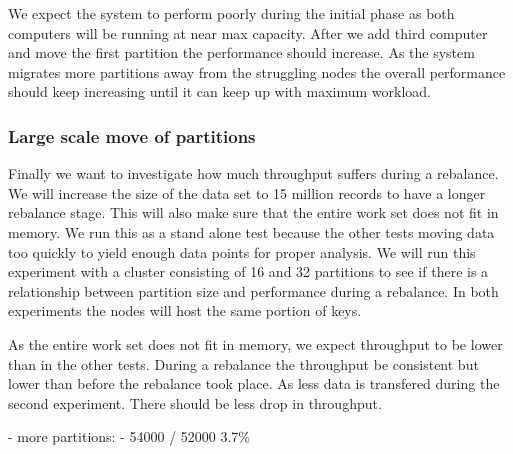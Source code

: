 We expect the system to perform poorly during the initial phase as both computers will be running at near max capacity. After we add third computer and move the first partition the performance should increase. As the system migrates more partitions away from the struggling nodes the overall performance should keep increasing until it can keep up with maximum workload. 

\subsubsection{Large scale move of partitions}
Finally we want to investigate how much throughput suffers during a rebalance. We will increase the size of the data set to 15 million records to have a longer rebalance stage. This will also make sure that the entire work set does not fit in memory. We run this as a stand alone test because the other tests moving data too quickly to yield enough data points for proper analysis. We will run this experiment with a cluster consisting of 16 and 32 partitions to see if there is a relationship between partition size and performance during a rebalance. In both experiments the nodes will host the same portion of keys.  

As the entire work set does not fit in memory, we expect throughput to be lower than in the other tests. During a rebalance the throughput be consistent but lower than before the rebalance took place. As less data is transfered during the second experiment. There should be less drop in throughput. 



- more partitions:
	- 54000 / 52000 3.7\%










